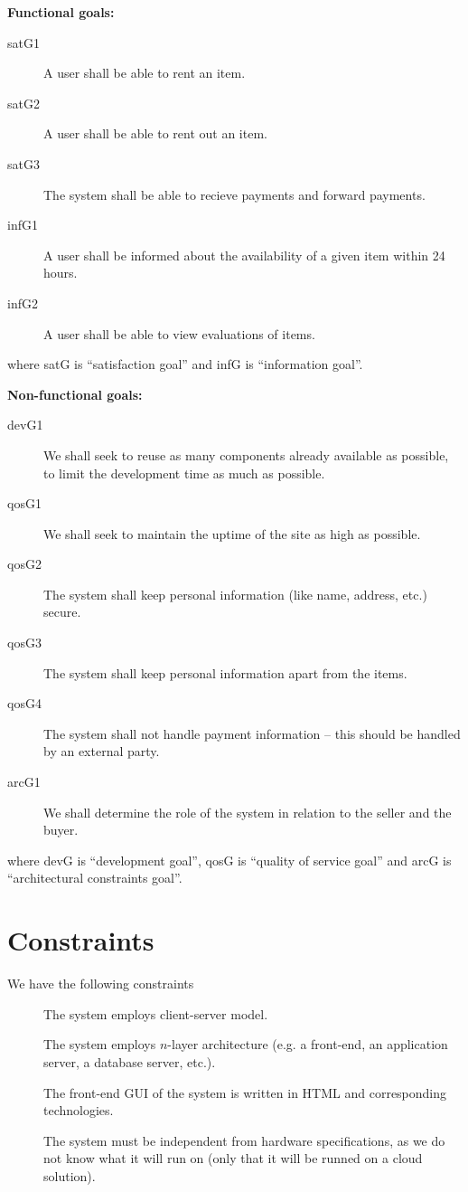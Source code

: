 \documentclass[a4paper,11pt]{report}
\begin{document}
\textbf{Functional goals:}
\begin{description}
  \item[satG1] A user shall be able to rent an item.
  \item[satG2] A user shall be able to rent out an item.
  \item[satG3] The system shall be able to recieve payments and forward payments.
  \item[infG1] A user shall be informed about the availability of a given item within 24 hours.
  \item[infG2] A user shall be able to view evaluations of items.
\end{description}
where satG is ``satisfaction goal'' and infG is ``information goal''.

\textbf{Non-functional goals:}
\begin{description}
  \item[devG1] We shall seek to reuse as many components already available as possible, to limit the development time as much as possible.
  \item[qosG1] We shall seek to maintain the uptime of the site as high as possible.
  \item[qosG2] The system shall keep personal information (like name, address, etc.) secure.
  \item[qosG3] The system shall keep personal information apart from the items. %
  \item[qosG4] The system shall not handle payment information --  this should be handled by an external party.
  \item[arcG1] We shall determine the role of the system in relation to the seller and the buyer.
\end{description}
where devG is ``development goal'', qosG is ``quality of service goal'' and arcG is ``architectural constraints goal''.


\section{Constraints}
\label{sec:constraints}
We have the following constraints
\begin{description}
  \item[] The system employs client-server model.
  \item[] The system employs $n$-layer architecture (e.g. a front-end, an application server, a database server, etc.).
  \item[] The front-end GUI of the system is written in HTML and corresponding technologies.
  \item[] The system must be independent from hardware specifications, as we do not know what it will run on (only that it will be runned on a cloud solution).
\end{description}
\end{document}
